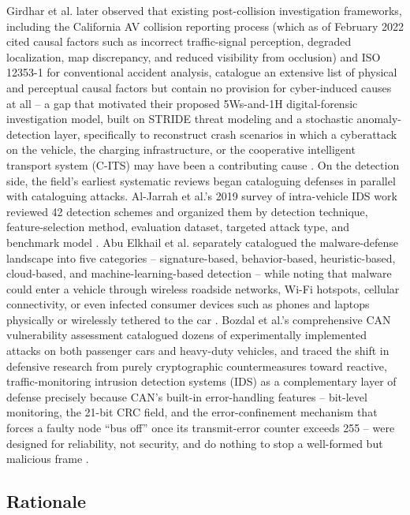 \documentclass[journal]{IEEEtran}
\begin{document}
	Girdhar et al. later observed that existing post-collision investigation
	frameworks, including the California AV collision reporting process
	(which as of February 2022 cited causal factors such as incorrect
	traffic-signal perception, degraded localization, map discrepancy, and
	reduced visibility from occlusion) and ISO 12353-1 for conventional
	accident analysis, catalogue an extensive list of physical and
	perceptual causal factors but contain no provision for cyber-induced
	causes at all -- a gap that motivated their proposed 5Ws-and-1H
	digital-forensic investigation model, built on STRIDE threat modeling and
	a stochastic anomaly-detection layer, specifically to reconstruct crash
	scenarios in which a cyberattack on the vehicle, the charging
	infrastructure, or the cooperative intelligent transport system (C-ITS)
	may have been a contributing cause \cite{ref1}. On the detection side,
	the field's earliest systematic reviews began cataloguing defenses in
	parallel with cataloguing attacks. Al-Jarrah et al.'s 2019 survey of
	intra-vehicle IDS work reviewed 42 detection schemes and organized them
	by detection technique, feature-selection method, evaluation dataset,
	targeted attack type, and benchmark model \cite{ref6}. Abu Elkhail et al.
	separately catalogued the malware-defense landscape into five categories
	-- signature-based, behavior-based, heuristic-based, cloud-based, and
	machine-learning-based detection -- while noting that malware could enter
	a vehicle through wireless roadside networks, Wi-Fi hotspots, cellular
	connectivity, or even infected consumer devices such as phones and
	laptops physically or wirelessly tethered to the car \cite{ref4}. Bozdal
	et al.'s comprehensive CAN vulnerability assessment catalogued dozens of
	experimentally implemented attacks on both passenger cars and
	heavy-duty vehicles, and traced the shift in defensive research from
	purely cryptographic countermeasures toward reactive, traffic-monitoring
	intrusion detection systems (IDS) as a complementary layer of defense
	precisely because CAN's built-in error-handling features -- bit-level
	monitoring, the 21-bit CRC field, and the error-confinement mechanism
	that forces a faulty node ``bus off'' once its transmit-error counter
	exceeds 255 -- were designed for reliability, not security, and do
	nothing to stop a well-formed but malicious frame \cite{ref10}.
	
	\subsection{Rationale}
	
\end{document}
